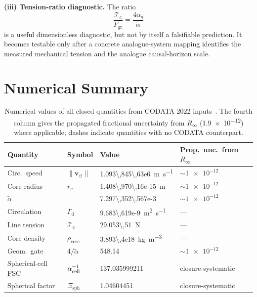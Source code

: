 \documentclass[aps,pra,preprint,longbibliography,nofootinbib]{revtex4-2}
\newcommand{\vnorm}{\lVert\mathbf{v}_{\!\boldsymbol{\circlearrowleft}}\rVert} %
\newcommand{\rhocore}{\rho_{\mathrm{core}}}      %
\newcommand{\rc}{r_c}                            %
\newcommand{\Rinf}{R_\infty}                     %
\newcommand{\Tc}{\mathcal{T}_c}                  %
\newcommand{\Fgr}{F_{\mathrm{gr}}}              %
\newcommand{\Gz}{\Gamma_0}                       %
\newcommand{\Xsph}{\Xi_{\mathrm{sph}}}             %
\begin{document}
\medskip
\noindent\textbf{(iii) Tension-ratio diagnostic.}
The ratio
\begin{equation}
  \frac{\Tc}{\Fgr}=\frac{4\alpha_g}{\tilde\alpha}
  \label{eq:tension_ratio_diagnostic}
\end{equation}
is a useful dimensionless diagnostic, but not by itself a falsifiable
prediction.  It becomes testable only after a concrete analogue-system
mapping identifies the measured mechanical tension and the analogue
causal-horizon scale.

\section{Numerical Summary}
\label{sec:numerical}

\begin{table}[h]
\centering
\caption{Numerical values of all closed quantities from CODATA 2022
inputs~\cite{MohrTaylor2022}.
The fourth column gives the propagated fractional uncertainty from $\Rinf$
(\num{1.9e-12}) where applicable; dashes indicate quantities with no
CODATA counterpart.}
\label{tab:numbers}
\begin{tabular}{llll}
\toprule
Quantity & Symbol & Value & Prop.\ unc.\ from $\Rinf$ \\
\midrule
Circ.\ speed   & $\vnorm$ & \SI{1.093\,845\,63e6}{\m\per\s}      & $\sim\num{1e-12}$ \\
Core radius    & $\rc$    & \SI{1.408\,970\,16e-15}{\meter}       & $\sim\num{1e-12}$ \\
$\tilde\alpha$ &          & \num{7.297\,352\,567e-3}              & $\sim\num{1e-12}$ \\
Circulation    & $\Gz$    & \SI{9.683\,619e-9}{\m\squared\per\s}  & — \\
Line tension   & $\Tc$    & \SI{29.053\,51}{\newton}               & — \\
Core density   & $\rhocore$& \SI{3.893\,4e18}{\kg\per\m\cubed}    & — \\
Geom.\ gate    & $4/\tilde\alpha$ & \num{548.14}               & $\sim\num{1e-12}$ \\
Spherical-cell FSC & $\alpha_{\rm cell}^{-1}$ & \num{137.035999211} & closure-systematic \\
Spherical factor & $\Xsph$ & \num{1.04604451} & closure-systematic \\
\bottomrule
\end{tabular}
\end{table}
\end{document}
